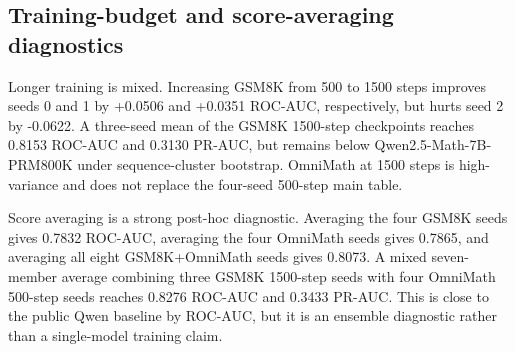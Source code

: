 \documentclass{article}
\begin{document}
\begin{table}[h]
\centering
\small
{}
\caption{Held-out threshold calibration. Thresholds are chosen on the first 200 MATH solutions and evaluated on the remaining 800.}
\label{tab:calibration}
\end{table}

\subsection{Training-budget and score-averaging diagnostics}

Longer training is mixed.
Increasing GSM8K from 500 to 1500 steps improves seeds 0 and 1 by +0.0506 and +0.0351 ROC-AUC, respectively, but hurts seed 2 by -0.0622.
A three-seed mean of the GSM8K 1500-step checkpoints reaches 0.8153 ROC-AUC and 0.3130 PR-AUC, but remains below Qwen2.5-Math-7B-PRM800K under sequence-cluster bootstrap.
OmniMath at 1500 steps is high-variance and does not replace the four-seed 500-step main table.

Score averaging is a strong post-hoc diagnostic.
Averaging the four GSM8K seeds gives 0.7832 ROC-AUC, averaging the four OmniMath seeds gives 0.7865, and averaging all eight GSM8K+OmniMath seeds gives 0.8073.
A mixed seven-member average combining three GSM8K 1500-step seeds with four OmniMath 500-step seeds reaches 0.8276 ROC-AUC and 0.3433 PR-AUC.
This is close to the public Qwen baseline by ROC-AUC, but it is an ensemble diagnostic rather than a single-model training claim.
\end{document}
